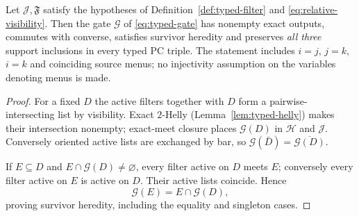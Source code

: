 \begin{lemma}
\label{lem:typed-all-PC}
Let $\mathcal J,\mathfrak F$ satisfy the hypotheses of
Definition~\ref{def:typed-filter} and
\eqref{eq:relative-visibility}.  Then the gate $\mathcal G$
of \eqref{eq:typed-gate} has nonempty exact outputs, commutes with
converse, satisfies survivor heredity and preserves
\emph{all three} support inclusions in every typed PC triple.
The statement includes $i=j$, $j=k$, $i=k$ and coinciding source
menus; no injectivity assumption on the variables denoting menus
is made.
\end{lemma}
\begin{proof}
For a fixed $D$ the active filters together with $D$ form a
pairwise-intersecting list by visibility.  Exact $2$-Helly
(Lemma~\ref{lem:typed-helly}) makes their intersection nonempty;
exact-meet closure places $\mathcal G(D)$ in $\mathcal H$ and
$\mathcal J$.  Conversely oriented active lists are exchanged by
bar, so $\mathcal G(\bar D)=\overline{\mathcal G(D)}$.

If $E\subseteq D$ and $E\cap\mathcal G(D)\ne\varnothing$, every
filter active on $D$ meets $E$; conversely every filter active on
$E$ is active on $D$.  Their active lists coincide.  Hence
\[
 \mathcal G(E)=E\cap\mathcal G(D),
\]
proving survivor heredity, including the equality and singleton
cases.


\end{proof}
